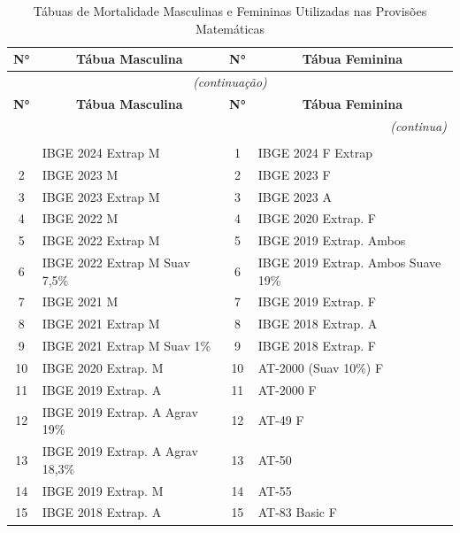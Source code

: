 \begin{singlespace}
\begin{longtable}{clcl}
\caption{Tábuas de Mortalidade Masculinas e Femininas Utilizadas nas Provisões Matemáticas}
\label{tab:tabuas_utilizadas} \\
\toprule
\multicolumn{1}{c}{\textbf{N°}} & \multicolumn{1}{c}{\textbf{Tábua Masculina}} & \multicolumn{1}{c}{\textbf{N°}} & \multicolumn{1}{c}{\textbf{Tábua Feminina}} \\
\midrule
\endfirsthead
\multicolumn{4}{c}{\small\textit{(continuação)}} \\
\toprule
\multicolumn{1}{c}{\textbf{N°}} & \multicolumn{1}{c}{\textbf{Tábua Masculina}} & \multicolumn{1}{c}{\textbf{N°}} & \multicolumn{1}{c}{\textbf{Tábua Feminina}} \\
\midrule
\endhead
\midrule
\multicolumn{4}{r}{\small\textit{(continua)}} \\
\endfoot
\bottomrule
\multicolumn{4}{l}{\small Fonte: Elaboração própria (2026).} \\
\endlastfoot
1  & IBGE 2024 Extrap M                & 1  & IBGE 2024 F Extrap \\
2  & IBGE 2023 M                       & 2  & IBGE 2023 F \\
3  & IBGE 2023 Extrap M                & 3  & IBGE 2023 A \\
4  & IBGE 2022 M                       & 4  & IBGE 2020 Extrap. F \\
5  & IBGE 2022 Extrap M                & 5  & IBGE 2019 Extrap. Ambos \\
6  & IBGE 2022 Extrap M Suav 7,5\%    & 6  & IBGE 2019 Extrap. Ambos Suave 19\% \\
7  & IBGE 2021 M                       & 7  & IBGE 2019 Extrap. F \\
8  & IBGE 2021 Extrap M                & 8  & IBGE 2018 Extrap. A \\
9  & IBGE 2021 Extrap M Suav 1\%      & 9  & IBGE 2018 Extrap. F \\
10 & IBGE 2020 Extrap. M               & 10 & AT-2000 (Suav 10\%) F \\
11 & IBGE 2019 Extrap. A               & 11 & AT-2000 F \\
12 & IBGE 2019 Extrap. A Agrav 19\%   & 12 & AT-49 F \\
13 & IBGE 2019 Extrap. A Agrav 18,3\% & 13 & AT-50 \\
14 & IBGE 2019 Extrap. M               & 14 & AT-55 \\
15 & IBGE 2018 Extrap. A               & 15 & AT-83 Basic F \\

\end{longtable}
\end{singlespace}
